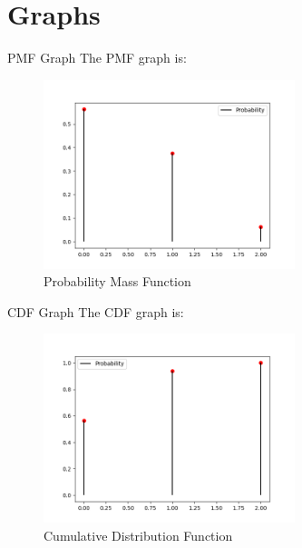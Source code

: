 \documentclass{beamer}
\begin{document}
\section{Graphs}
\begin{frame}{PMF Graph}
The PMF graph is:
    \begin{figure}[!ht]
		\centering
		\includegraphics[width=\textwidth,height=5.5cm,keepaspectratio]{figures/figure1.png}
		\caption{Probability Mass Function}
		\label{fig1}
	\end{figure}
\end{frame}

\begin{frame}{CDF Graph}
The CDF graph is:
    \begin{figure}[!ht]
		\centering
		\includegraphics[width=\textwidth,height=5.5cm,keepaspectratio]{figures/figure2.png}
		\caption{Cumulative Distribution Function}
		\label{fig2}
	
\end{figure}
\end{frame}
\end{document}
